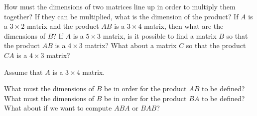 \documentclass{ximera}
\begin{document}

\begin{exercise}
    \begin{tasks}
        \task How must the dimensions of two matrices line up in order to multiply them together? If they can be multiplied, what is the dimension of the product?
        \task If $A$ is a $3 \times 2$ matrix and the product $AB$ is a $3 \times 4$ matrix, then what are the dimensions of $B$?
        \task If $A$ is a $5 \times 3$ matrix, is it possible to find a matrix $B$ so that the product $AB$ is a $4 \times 3$ matrix? What about a matrix $C$ so that the product $CA$ is a $4 \times 3$ matrix?
    \end{tasks}
\end{exercise}

\begin{exercise} \label{ex:MatDims}
    Assume that $A$ is a $3\times 4$ matrix.
    \begin{tasks}
        \task What must the dimensions of $B$ be in order for the product $AB$ to be defined?
        \task What must the dimensions of $B$ be in order for the product $BA$ to be defined?
        \task What about if we want to compute $ABA$ or $BAB$?
    \end{tasks} 
\end{exercise}
\end{document}
